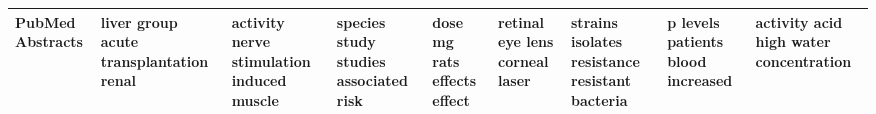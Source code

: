 \documentclass[11pt,a4paper]{article}
\begin{document}
\begin{appendices}
\begin{table}[htp]
\begin{tiny}
\begin{tabular}{|p{}|p{}|p{}|p{}|p{}|p{}|p{}|p{}|p{}|}
PubMed Abstracts & liver \newline group \newline acute \newline transplantation \newline renal & activity \newline nerve \newline stimulation \newline induced \newline muscle & species \newline study \newline studies \newline associated \newline risk & dose \newline mg \newline rats \newline effects \newline effect & retinal \newline eye \newline lens \newline corneal \newline laser & strains \newline isolates \newline resistance \newline resistant \newline bacteria & p \newline levels \newline patients \newline blood \newline increased & activity \newline acid \newline high \newline water \newline concentration\\\hline

\end{tabular}
\end{tiny}
\end{table}
\end{appendices}
\end{document}
